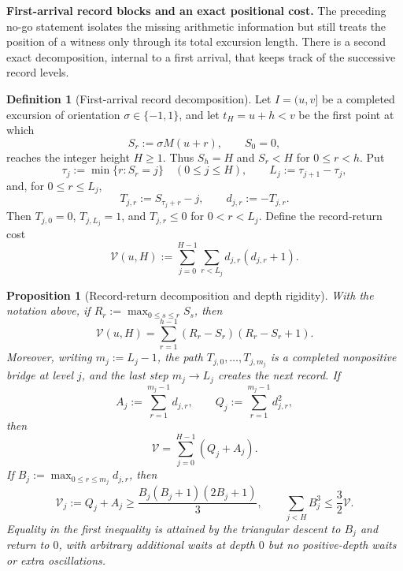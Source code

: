 \documentclass[11pt,reqno]{amsart}
\numberwithin{equation}{section}
\theoremstyle{plain}
\newtheorem{proposition}[theorem]{Proposition}
\theoremstyle{definition}
\newtheorem{definition}[theorem]{Definition}
\theoremstyle{remark}
\begin{document}
\medskip
\noindent\textbf{First-arrival record blocks and an exact positional cost.}
The preceding no-go statement isolates the missing arithmetic information but
still treats the position of a witness only through its total excursion length.
There is a second exact decomposition, internal to a first arrival, that keeps
track of the successive record levels.

\begin{definition}[First-arrival record decomposition]
\label{def:first-arrival-records}
Let $I=(u,v]$ be a completed excursion of orientation $\sigma\in\{-1,1\}$,
and let $t_H=u+h<v$ be the first point at which
\begin{equation}
S_r:=\sigma M(u+r),\qquad S_0=0,
\end{equation}
reaches the integer height $H\ge1$.  Thus $S_h=H$ and $S_r<H$ for
$0\le r<h$.  Put
\begin{equation}
\tau_j:=\min\{r:S_r=j\}\quad(0\le j\le H),\qquad
L_j:=\tau_{j+1}-\tau_j,
\end{equation}
and, for $0\le r\le L_j$,
\begin{equation}
T_{j,r}:=S_{\tau_j+r}-j,\qquad d_{j,r}:=-T_{j,r}.
\end{equation}
Then $T_{j,0}=0$, $T_{j,L_j}=1$, and $T_{j,r}\le0$ for
$0<r<L_j$.  Define the record-return cost
\begin{equation}
\label{eq:record-cost}
\mathcal V(u,H):=\sum_{j=0}^{H-1}\sum_{r<L_j}d_{j,r}(d_{j,r}+1).
\end{equation}
\end{definition}

\begin{proposition}[Record-return decomposition and depth rigidity]
\label{prop:record-return-cost}
With the notation above, if
$R_r:=\max_{0\le s\le r}S_s$, then
\begin{equation}
\label{eq:record-global}
\mathcal V(u,H)
=\sum_{r=1}^{h-1}(R_r-S_r)(R_r-S_r+1).
\end{equation}
Moreover, writing $m_j:=L_j-1$, the path
$T_{j,0},\ldots,T_{j,m_j}$ is a completed nonpositive bridge at level $j$,
and the last step $m_j\to L_j$ creates the next record.  If
\begin{equation}
A_j:=\sum_{r=1}^{m_j-1}d_{j,r},\qquad
Q_j:=\sum_{r=1}^{m_j-1}d_{j,r}^2,
\end{equation}
then
\begin{equation}
\mathcal V=\sum_{j=0}^{H-1}(Q_j+A_j).
\end{equation}
If $B_j:=\max_{0\le r\le m_j}d_{j,r}$, then
\begin{equation}
\label{eq:record-depth-cubic}
\mathcal V_j:=Q_j+A_j
\ge \frac{B_j(B_j+1)(2B_j+1)}3,
\qquad
\sum_{j<H}B_j^3\le\frac32\mathcal V.
\end{equation}
Equality in the first inequality is attained by the triangular descent to
$B_j$ and return to $0$, with arbitrary additional waits at depth $0$ but no
positive-depth waits or extra oscillations.
\end{proposition}
\end{document}
